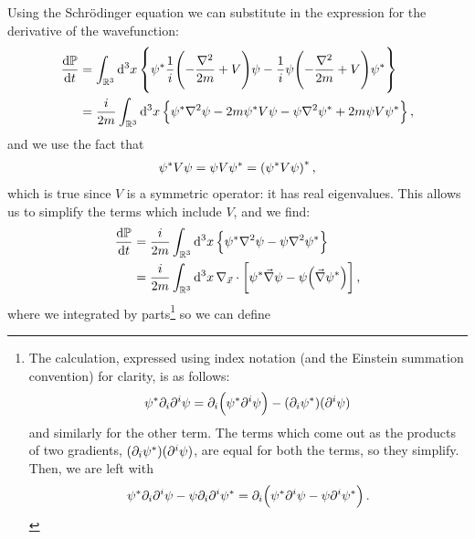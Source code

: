 \documentclass[main.tex]{subfiles}
\begin{document}
Using the Schrödinger equation we can substitute in the expression for the derivative of the wavefunction: 
%
\begin{subequations}
\begin{align}
\dv{\mathbb{P}}{t} &= \int_{\mathbb{R}^3} \dd[3]{x} \qty{
\psi^{*}  \frac{1}{i}\qty(-\frac{\nabla^2}{2m}+V) \psi - \frac{1}{i} \psi \qty(- \frac{\nabla^2}{2m} + V) \psi^{*}   
}  \\
&= \frac{i}{2m} \int_{\mathbb{R}^3} \dd[3]{x} \qty{
\psi^{*} \nabla^2 \psi - 2m \psi^{*} V \psi 
- \psi \nabla^2 \psi^{*}
+ 2m \psi V \psi^{*}
}
\,,
\end{align}
\end{subequations}
%
and we use the fact that 
%
\begin{align}
\psi^{*} V \psi  = \psi V \psi^{*} = \qty(\psi^{*} V \psi )^{*}
\,,
\end{align}
%
which is true since \(V\) is a symmetric operator: it has real eigenvalues. This allows us to simplify the terms which include \(V\), and we find:
%
\begin{subequations}
\begin{align}
\dv{\mathbb{P}}{t} &= \frac{i}{2m} \int_{\mathbb{R}^3 } \dd[3]{x} \qty{
\psi^{*} \nabla^2 \psi 
- \psi \nabla^2 \psi^{*}  
}  \\
&= \frac{i}{2m} \int_{\mathbb{R}^3} \dd[3]{x}
\nabla_{\vec{x}} \cdot \qty[
\psi^{*} \vec{\nabla} \psi - \psi\qty(\vec{\nabla} \psi^{*})]
\,,
\end{align}
\end{subequations}
%
where we integrated by parts\footnote{The calculation, expressed using index notation (and the Einstein summation convention) for clarity, is as follows: 
%
\begin{align}
\psi^{*} \partial_{i} \partial^{i} \psi  = \partial_{i} \qty(\psi^{*} \partial^{i} \psi)  - (\partial_{i} \psi^{*})(\partial^{i} \psi)
\,
\end{align}
%
and similarly for the other term. The terms which come out as the products of two gradients, \(\qty(\partial_{i} \psi^{*}) (\partial^{i} \psi)\), are equal for both the terms, so they simplify. Then, we are left with 
%
\begin{align}
\psi^{*} \partial_{i} \partial^{i} \psi - \psi \partial_{i} \partial^{i} \psi^{*} = \partial_{i} \qty(\psi^{*} \partial^{i} \psi - \psi \partial^{i} \psi^{*})
\,.
\end{align}
%
} so we can define 
\end{document}
